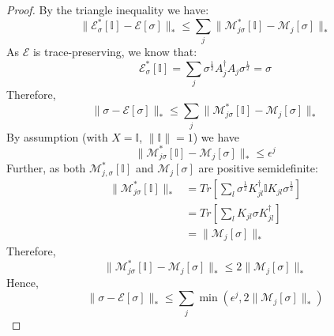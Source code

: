 \documentclass[aps,floatfix,10pt,amssymb,amsfont,amsmath,superscriptaddress,float,nofootinbib,longbibliography,nobalancelastpage,twocolumn]{revtex4-2}
\begin{document}
\begin{proof}
    By the triangle inequality we have:
    \begin{equation}
        \|\mathcal{E}^*_{\sigma}[\mathbb{I}]-\mathcal{E}[\sigma]\|_* \leq \sum_j \|\mathcal{M}^*_{j\sigma}[\mathbb{I}]-\mathcal{M}_{j}[\sigma]\|_*
    \end{equation}
    As $\mathcal{E}$ is trace-preserving, we know that:
    \begin{equation}
        \mathcal{E}^*_{\sigma}[\mathbb{I}] = \sum_{j} \sigma^{\frac{1}{2}}A^{\dagger}_{j} A_{j}\sigma^{\frac{1}{2}} = \sigma
    \end{equation}
    Therefore,
    \begin{equation}
        \|\sigma - \mathcal{E}[\sigma]\|_* \leq \sum_j \|\mathcal{M}^*_{j\sigma}[\mathbb{I}]-\mathcal{M}_{j}[\sigma]\|_*
    \end{equation}
    By assumption (with $X=\mathbb{I}$, $\|\mathbb{I}\|=1$) we have
    \begin{equation}
        \|\mathcal{M}^*_{j\sigma}[\mathbb{I}]-\mathcal{M}_{j}[\sigma]\|_* \leq \epsilon^j
    \end{equation}
    Further, as both
$\mathcal{M}_{j,\sigma}^{*}[\mathbb{I}]$ and
$\mathcal{M}_j[\sigma]$ are positive semidefinite:
    \begin{align}
        \|\mathcal{M}^*_{j\sigma}[\mathbb{I}]\|_* &= Tr\left[\sum_l \sigma^{\frac{1}{2}} K_{jl}^{\dagger} \mathbb{I} K_{jl} \sigma^{\frac{1}{2}}\right]\\
        &= Tr\left[\sum_l K_{jl}\sigma K_{jl}^{\dagger}\right]\\
        &= \|\mathcal{M}_{j}[\sigma]\|_*
    \end{align}
    Therefore,
    \begin{equation}
         \|\mathcal{M}^*_{j\sigma}[\mathbb{I}]-\mathcal{M}_{j}[\sigma]\|_* \leq 2\|\mathcal{M}_{j}[\sigma]\|_*
    \end{equation}
    Hence,
    \begin{equation}
        \|\sigma-\mathcal{E}[\sigma]\|_* \leq \sum_j \min \left(\epsilon^j, 2\|\mathcal{M}_{j}[\sigma]\|_*\right)
    \end{equation}
\end{proof}

\end{document}
